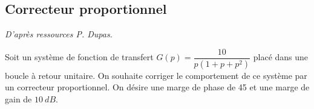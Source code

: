 \begin{multicols}{2}
%
%
%
%
%
%
%
%
%
%
%
%
%
%
\subsection*{Correcteur proportionnel}
\textit{D'après ressources P. Dupas.}


\setcounter{exo}{0}
Soit un système de fonction de transfert $G(p)=\dfrac{10}{p\left(1+p+p^2\right)}$ placé dans une boucle à retour unitaire. On souhaite corriger le comportement de ce système par un correcteur proportionnel. On désire une marge de phase de \SI{45}{\degres} et une marge de gain de $\SI{10}{dB}$.


\end{multicols}
